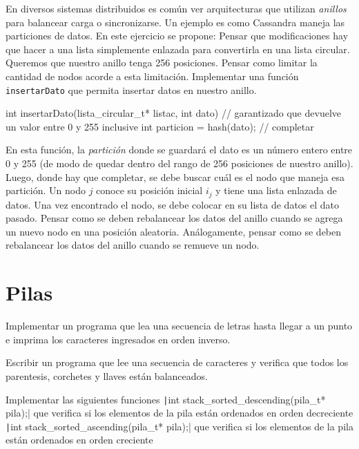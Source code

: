 \documentclass[titlepage,oneside]{book}
\begin{document}
\begin{Exercise}
	En diversos sistemas distribuidos es común ver arquitecturas que utilizan \textit{anillos} para balancear carga o sincronizarse. Un ejemplo es como Cassandra maneja las particiones de datos. En este ejercicio se propone:
	\Question Pensar que modificaciones hay que hacer a una lista simplemente enlazada para convertirla en una lista circular.
	\Question Queremos que nuestro anillo tenga 256 posiciones. Pensar como limitar la cantidad de nodos acorde a esta limitación.
	\Question Implementar una función \texttt{insertarDato} que permita insertar datos en nuestro anillo.

	\begin{ccode}
	int insertarDato(lista_circular_t* listac, int dato) {
		// garantizado que devuelve un valor entre 0 y 255 inclusive
		int particion = hash(dato);
		// completar
	}
	\end{ccode}

	En esta función, la \textit{partición} donde se guardará el dato es un número entero entre 0 y 255 (de modo de quedar dentro del rango de 256 posiciones de nuestro anillo). Luego, donde hay que completar, se debe buscar cuál es el nodo que maneja esa partición. Un nodo $j$ conoce su posición inicial $i_j$ y tiene una lista enlazada de datos. Una vez encontrado el nodo, se debe colocar en su lista de datos el dato pasado.
	\Question Pensar como se deben rebalancear los datos del anillo cuando se agrega un nuevo nodo en una posición aleatoria.
	\Question Análogamente, pensar como se deben rebalancear los datos del anillo cuando se remueve un nodo.
\end{Exercise}

\chapter{Pilas}
\begin{Exercise}
	Implementar un programa que lea una secuencia de letras hasta llegar a un punto e imprima los caracteres ingresados en orden inverso.
\end{Exercise}

\begin{Exercise}
	Escribir un programa que lee una secuencia de caracteres y verifica que todos los parentesis, corchetes y llaves están balanceados.
\end{Exercise}

\begin{Exercise}
	Implementar las siguientes funciones
	\Question \texttt|int stack_sorted_descending(pila_t* pila);| que verifica si los elementos de la pila están ordenados en orden decreciente
	\Question \texttt|int stack_sorted_ascending(pila_t* pila);| que verifica si los elementos de la pila están ordenados en orden creciente
\end{Exercise}
\end{document}
